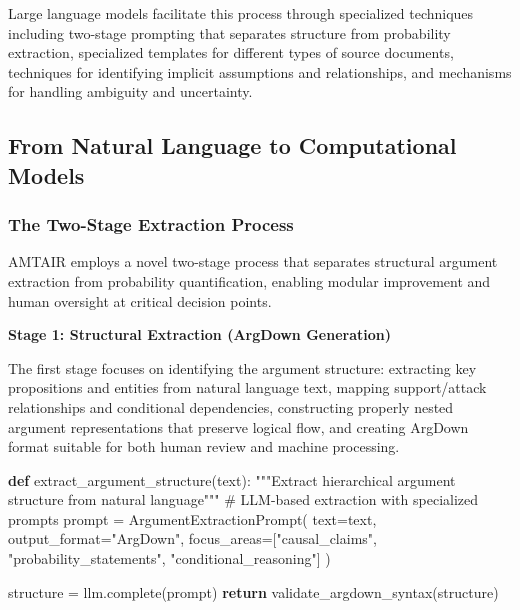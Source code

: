 \documentclass[
  11pt,
  letterpaper,
]{book}
\newenvironment{Shaded}{\begin{snugshade}}{\end{snugshade}}
\newcommand{\CommentTok}[1]{\textcolor[rgb]{0.37,0.37,0.37}{#1}}
\newcommand{\ControlFlowTok}[1]{\textcolor[rgb]{0.00,0.23,0.31}{\textbf{#1}}}
\newcommand{\KeywordTok}[1]{\textcolor[rgb]{0.00,0.23,0.31}{\textbf{#1}}}
\newcommand{\NormalTok}[1]{\textcolor[rgb]{0.00,0.23,0.31}{#1}}
\newcommand{\OperatorTok}[1]{\textcolor[rgb]{0.37,0.37,0.37}{#1}}
\newcommand{\StringTok}[1]{\textcolor[rgb]{0.13,0.47,0.30}{#1}}
\begin{document}
Large language models facilitate this process through specialized
techniques including two-stage prompting that separates structure from
probability extraction, specialized templates for different types of
source documents, techniques for identifying implicit assumptions and
relationships, and mechanisms for handling ambiguity and uncertainty.

\subsection{From Natural Language to Computational
Models}\label{sec-natural-to-computational}

\subsubsection{The Two-Stage Extraction
Process}\label{sec-two-stage-extraction}

AMTAIR employs a novel two-stage process that separates structural
argument extraction from probability quantification, enabling modular
improvement and human oversight at critical decision points.

\textbf{Stage 1: Structural Extraction (ArgDown Generation)}

The first stage focuses on identifying the argument structure:
extracting key propositions and entities from natural language text,
mapping support/attack relationships and conditional dependencies,
constructing properly nested argument representations that preserve
logical flow, and creating ArgDown format suitable for both human review
and machine processing.

\begin{Shaded}
\begin{Highlighting}[]
\KeywordTok{def}\NormalTok{ extract\_argument\_structure(text):}
    \CommentTok{"""Extract hierarchical argument structure from natural language"""}
    \CommentTok{\# LLM{-}based extraction with specialized prompts}
\NormalTok{    prompt }\OperatorTok{=}\NormalTok{ ArgumentExtractionPrompt(}
\NormalTok{        text}\OperatorTok{=}\NormalTok{text,}
\NormalTok{        output\_format}\OperatorTok{=}\StringTok{"ArgDown"}\NormalTok{,}
\NormalTok{        focus\_areas}\OperatorTok{=}\NormalTok{[}\StringTok{"causal\_claims"}\NormalTok{, }\StringTok{"probability\_statements"}\NormalTok{, }\StringTok{"conditional\_reasoning"}\NormalTok{]}
\NormalTok{    )}
    
\NormalTok{    structure }\OperatorTok{=}\NormalTok{ llm.complete(prompt)}
    \ControlFlowTok{return}\NormalTok{ validate\_argdown\_syntax(structure)}
\end{Highlighting}
\end{Shaded}
\end{document}
